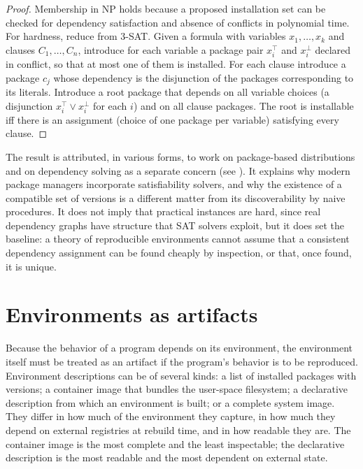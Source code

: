 \documentclass[11pt,twoside,openright]{book}
\theoremstyle{plain}
\theoremstyle{definition}
\theoremstyle{remark}
\begin{document}
\begin{proof}
Membership in NP holds because a proposed installation set can be checked for dependency satisfaction and absence of conflicts in polynomial time. For hardness, reduce from 3-SAT. Given a formula with variables $x_1,\dots,x_k$ and clauses $C_1,\dots,C_n$, introduce for each variable a package pair $x_i^{\top}$ and $x_i^{\bot}$ declared in conflict, so that at most one of them is installed. For each clause introduce a package $c_j$ whose dependency is the disjunction of the packages corresponding to its literals. Introduce a root package that depends on all variable choices (a disjunction $x_i^{\top}\lor x_i^{\bot}$ for each $i$) and on all clause packages. The root is installable iff there is an assignment (choice of one package per variable) satisfying every clause.
\end{proof}

The result is attributed, in various forms, to work on package-based distributions and on dependency solving as a separate concern (see \cite{mancinelli2006, abate2012}). It explains why modern package managers incorporate satisfiability solvers, and why the existence of a compatible set of versions is a different matter from its discoverability by naive procedures. It does not imply that practical instances are hard, since real dependency graphs have structure that SAT solvers exploit, but it does set the baseline: a theory of reproducible environments cannot assume that a consistent dependency assignment can be found cheaply by inspection, or that, once found, it is unique.

\section{Environments as artifacts}

Because the behavior of a program depends on its environment, the environment itself must be treated as an artifact if the program's behavior is to be reproduced. Environment descriptions can be of several kinds: a list of installed packages with versions; a container image that bundles the user-space filesystem; a declarative description from which an environment is built; or a complete system image. They differ in how much of the environment they capture, in how much they depend on external registries at rebuild time, and in how readable they are. The container image is the most complete and the least inspectable; the declarative description is the most readable and the most dependent on external state.
\end{document}
